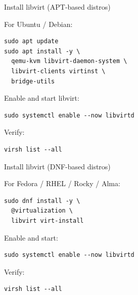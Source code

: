 \documentclass[aspectratio=169]{beamer}
\begin{document}
\begin{frame}[fragile]{Install libvirt (APT-based distros)}

For Ubuntu / Debian:

\begin{lstlisting}
sudo apt update
sudo apt install -y \
  qemu-kvm libvirt-daemon-system \
  libvirt-clients virtinst \
  bridge-utils
\end{lstlisting}

Enable and start libvirt:

\begin{lstlisting}
sudo systemctl enable --now libvirtd
\end{lstlisting}

Verify:

\begin{lstlisting}
virsh list --all
\end{lstlisting}

\end{frame}


\begin{frame}[fragile]{Install libvirt (DNF-based distros)}

For Fedora / RHEL / Rocky / Alma:

\begin{lstlisting}
sudo dnf install -y \
  @virtualization \
  libvirt virt-install
\end{lstlisting}

Enable and start:

\begin{lstlisting}
sudo systemctl enable --now libvirtd
\end{lstlisting}

Verify:

\begin{lstlisting}
virsh list --all
\end{lstlisting}

\end{frame}

\end{document}
